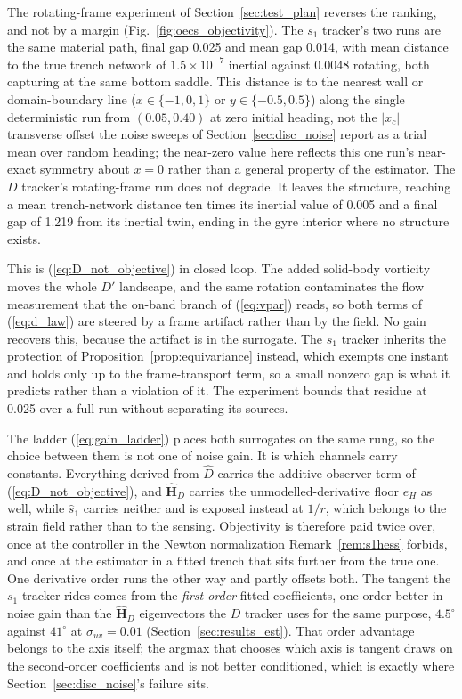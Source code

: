\documentclass[lettersize,journal]{IEEEtran}
\begin{document}
The rotating-frame experiment of Section~\ref{sec:test_plan} reverses the
ranking, and not by a margin (Fig.~\ref{fig:oecs_objectivity}). The $s_1$
tracker's two runs are the same material path, final gap 0.025 and mean gap
0.014, with mean distance to the true trench network of $1.5\times 10^{-7}$
inertial against 0.0048 rotating, both capturing at the same bottom saddle.
This distance is to the nearest wall or domain-boundary line ($x \in
\{-1,0,1\}$ or $y \in \{-0.5,0.5\}$) along the single deterministic run
from $(0.05, 0.40)$ at zero initial heading, not the $|x_c|$ transverse
offset the noise sweeps of Section~\ref{sec:disc_noise} report as a
trial mean over random heading; the near-zero value here reflects this
one run's near-exact symmetry about $x=0$ rather than a general property
of the estimator. The $D$
tracker's rotating-frame run does not degrade. It leaves the structure,
reaching a mean trench-network distance ten times its inertial value of
0.005 and a final gap of 1.219 from its inertial twin, ending in the gyre
interior where no structure exists.

This is (\ref{eq:D_not_objective}) in closed loop. The added solid-body
vorticity moves the whole $D'$ landscape, and the same rotation
contaminates the flow measurement that the on-band branch of
(\ref{eq:vpar}) reads, so both terms of (\ref{eq:d_law}) are steered by a
frame artifact rather than by the field. No gain recovers this, because the
artifact is in the surrogate. The $s_1$ tracker inherits the protection of
Proposition~\ref{prop:equivariance} instead, which exempts one instant and
holds only up to the frame-transport term, so a small nonzero gap is what
it predicts rather than a violation of it. The experiment bounds that
residue at 0.025 over a full run without separating its sources.

The ladder (\ref{eq:gain_ladder}) places both surrogates on the same rung,
so the choice between them is not one of noise gain. It is which channels
carry constants. Everything derived from $\hat{D}$ carries the additive
observer term of (\ref{eq:D_not_objective}), and $\hat{\mathbf{H}}_D$
carries the unmodelled-derivative floor $e_H$ as well, while $\hat{s}_1$
carries neither and is exposed instead at $1/r$, which belongs to the
strain field rather than to the sensing. Objectivity is therefore paid
twice over, once at the controller in the Newton normalization
Remark~\ref{rem:s1hess} forbids, and once at the estimator in a fitted
trench that sits further from the true one. One derivative order runs the
other way and partly offsets both. The tangent the $s_1$ tracker rides
comes from the
\emph{first-order} fitted coefficients, one order better in noise gain than
the $\hat{\mathbf{H}}_D$ eigenvectors the $D$ tracker uses for the same
purpose, $4.5^\circ$ against $41^\circ$ at $\sigma_{uv} = 0.01$
(Section~\ref{sec:results_est}). That order advantage belongs to the axis
itself; the argmax that chooses which axis is tangent draws on the
second-order coefficients and is not better conditioned, which is exactly
where Section~\ref{sec:disc_noise}'s failure sits.
\end{document}
